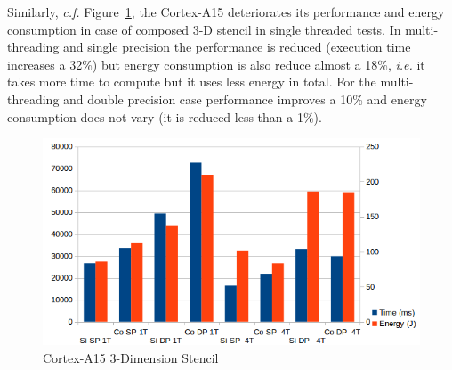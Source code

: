\documentclass{acm_proc_article-sp}
\begin{document}
Similarly, \textit{c.f.} Figure~\ref{pic:A15-3d}, the Cortex-A15 deteriorates its performance and energy consumption in case of composed 3-D stencil in single threaded tests. In multi-threading and single precision the performance is reduced (execution time increases a 32\%) but energy consumption is also reduce almost a 18\%, \textit{i.e.} it takes more time to compute but it uses less energy in total. For the multi-threading and double precision case performance improves a 10\% and energy consumption does not vary (it is reduced less than a 1\%).
\begin{figure}[ht!]
  \centering
  \includegraphics[scale=0.5]{results/A15-3D}
  \caption{Cortex-A15 3-Dimension Stencil}
  \label{pic:A15-3d}
\end{figure}
\end{document}

